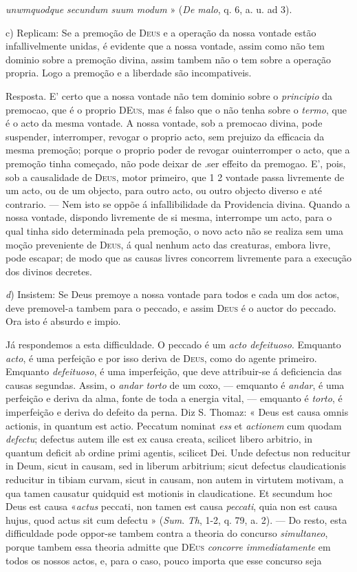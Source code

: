 \emph{unwmquodque secundum suum modum} » (\emph{De malo}, q. 6, a. u. ad 3).\par c) Replicam: Se a premoção de \textsc{Deus} e a operação da nossa vontade estão infallivelmente unidas, é evidente que a nossa vontade, assim como não tem dominio sobre a premoção divina, assim tambem não o tem sobre a operação propria. Logo a premoção e a liberdade são incompativeis.\par Resposta. E' certo que a nossa vontade não tem dominio sobre o \emph{principio} da premocao, que é o proprio \textsc{DEus}, mas é falso que o não tenha sobre o \emph{termo}, que é o acto da mesma vontade. A nossa vontade, sob a premocao divina, pode suspender, interromper, revogar o proprio acto, sem prejuizo da efficacia da mesma premoção; porque o proprio poder de revogar ouinterromper o acto, que a premoção tinha começado, não pode deixar de .ser effeito da premogao. E', pois, sob a causalidade de \textsc{Deus}, motor primeiro, que 1 2 vontade passa livremente de um acto, ou de um objecto, para outro acto, ou outro objecto diverso e até contrario. --- Nem isto se oppõe á infallibilidade da Providencia divina. Quando a nossa vontade, dispondo livremente de si mesma, interrompe um acto, para o qual tinha sido determinada pela premoção, o novo acto não se realiza sem uma moção preveniente de \textsc{Deus}, á qual nenhum acto das creaturas, embora livre, pode escapar; de modo que as causas livres concorrem livremente para a execução dos divinos decretes.\par \emph{d}) Insistem: Se Deus premoye a nossa vontade para todos e cada um dos actos, deve premovel-a tambem para o peccado, e assim \textsc{Deus} é o auctor do peccado. Ora isto é absurdo e impio.\par Já respondemos a esta difficuldade. O peccado é um \emph{acto defeituoso}. Emquanto \emph{acto}, é uma perfeição e por isso deriva de \textsc{Deus}, como do agente primeiro. Emquanto \emph{defeituoso}, é uma imperfeição, que deve attribuir-se á deficiencia das causas segundas. Assim, o \emph{andar torto} de um coxo, --- emquanto é \emph{andar}, é uma perfeição e deriva da alma, fonte de toda a energia vital, --- emquanto é \emph{torto}, é imperfeição e deriva do defeito da perna. Diz S. Thomaz: « Deus est causa omnis actionis, in quantum est actio. Peccatum nominat \emph{ess} et \emph{actionem} cum quodam \emph{defectu}; defectus autem ille est ex causa creata, scilicet libero arbitrio, in quantum deficit ab ordine primi agentis, scilicet Dei. Unde defectus non reducitur in Deum, sicut in causam, sed in liberum arbitrium; sicut defectus claudicationis reducitur in tibiam curvam, sicut in causam, non autem in virtutem motivam, a qua tamen causatur quidquid est motionis in claudicatione. Et secundum hoc Deus est causa «\emph{actus} peccati, non tamen est causa \emph{peccati}, quia non est causa hujus, quod actus sit cum defectu » (\emph{Sum}. \emph{Th}, 1-2, q. 79, a. 2). --- Do resto, esta difficuldade pode oppor-se tambem contra a theoria do concurso \emph{simultaneo}, porque tambem essa theoria admitte que \textsc{DEus} \emph{concorre immediatamente} em todos os nossos actos, e, para o caso, pouco importa que esse concurso seja 